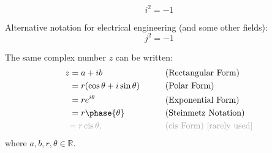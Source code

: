 \begin{multicols}{2}

    \begin{CheatsheetEntryFrame}

        \begin{equation*}
            i^2 = -1
        \end{equation*}

        Alternative notation for electrical engineering (and some other fields):
        \begin{equation*}
            j^2 = -1
        \end{equation*}


        The same complex number $z$ can be written:
        \begin{alignat*}{2}
            z
                &= a + ib &
                    \qquad & \text{(Rectangular Form)} \\
                &= r(\cos{\theta} + i \sin{\theta}) &
                    \qquad & \text{(Polar Form)} \\
                &= r e^{i \theta} &
                    \qquad & \text{(Exponential Form)} \\
                &= r \phase{\theta} &
                    \qquad & \text{(Steinmetz Notation)} \\
                &\Exn{= r \cis{\theta},} &
                    \qquad & \Exn{\text{(cis Form) [rarely used]}}
        \end{alignat*}%
        where $a, b, r, \theta \in \mathbb{R}$.



\end{CheatsheetEntryFrame}
\end{multicols}
